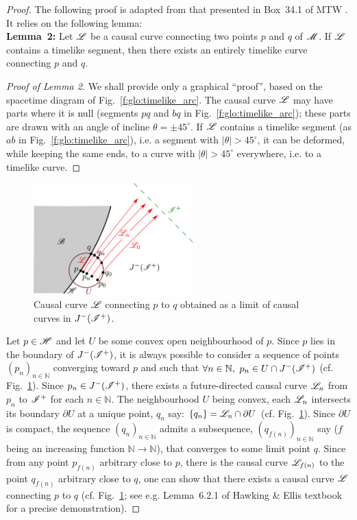 \begin{proof}
The following proof is adapted from that presented in Box~34.1 of MTW \cite{MisneTW73}.
It relies on the following lemma:\\[1ex]
\textbf{Lemma~2:} Let $\mathscr{L}$ be a causal curve connecting two points $p$ and $q$
of $\mathscr{M}$. If $\mathscr{L}$ contains a timelike segment, then there exists an
entirely timelike curve connecting $p$ and $q$.
\begin{proof}[Proof of Lemma 2]
We shall provide only a graphical ``proof'', based on the spacetime diagram
of Fig.~\ref{f:glo:timelike_arc}. The causal curve $\mathscr{L}$ may have parts where it is null (segments $pq$ and $bq$ in Fig.~\ref{f:glo:timelike_arc}); these parts are drawn with
an angle of incline $\theta = \pm 45^\circ$.
If $\mathscr{L}$ contains a timelike segment (as $ab$ in Fig.~\ref{f:glo:timelike_arc}), i.e. a segment with $|\theta|>45^\circ$,
it can be deformed, while keeping the same ends, to a curve with $|\theta|>45^\circ$
everywhere, i.e. to a timelike curve.
\end{proof}


\begin{figure}
\centerline{\includegraphics[width=0.55\textwidth]{glo_point_sequence.pdf}}
\caption[]{\label{f:glo:point_sequence} \footnotesize
Causal curve $\mathscr{L}$ connecting $p$ to $q$ obtained as a limit of causal curves
in $J^-(\mathscr{I}^+)$.}
\end{figure}


Let $p\in\mathscr{H}$ and let $U$ be some convex open neighbourhood of $p$.
Since $p$ lies in the boundary of $J^-(\mathscr{I}^+)$, it is always possible to
consider
a sequence of points $(p_n)_{n\in\mathbb{N}}$ converging toward $p$
and such that $\forall n\in\mathbb{N},\ p_n \in U \cap J^-(\mathscr{I}^+)$
(cf. Fig.~\ref{f:glo:point_sequence}).
Since $p_n\in J^-(\mathscr{I}^+)$,
there exists a future-directed causal curve $\mathscr{L}_{n}$ from $p_n$ to $\mathscr{I}^+$
for each $n\in\mathbb{N}$.
The neighbourhood $U$ being convex, each $\mathscr{L}_n$ intersects its boundary $\partial U$
at a unique point, $q_n$ say: $\{q_n\}=\mathscr{L}_n \cap \partial U$
(cf. Fig.~\ref{f:glo:point_sequence}).
Since $\partial U$
is compact, the sequence $(q_n)_{n\in\mathbb{N}}$ admits a subsequence,
$(q_{f(n)})_{n\in\mathbb{N}}$ say ($f$ being an increasing
function $\mathbb{N}\rightarrow\mathbb{N}$),
that converges to some limit point $q$.
Since from any point $p_{f(n)}$ arbitrary close to $p$, there is
the causal curve $\mathscr{L}_{f(n)}$ to the point $q_{f(n)}$ arbitrary close to $q$,
one can show that
there exists a causal curve $\mathscr{L}$ connecting $p$ to $q$
(cf. Fig.~\ref{f:glo:point_sequence}; see e.g.
Lemma~6.2.1 of Hawking \& Ellis textbook \cite{HawkiE73}
for a precise demonstration).


\end{proof}
